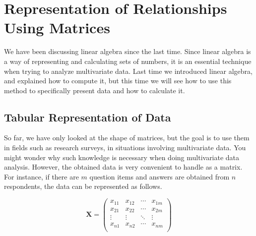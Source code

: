 \documentclass{ltjsbook}
\begin{document}
\chapter{Representation of Relationships Using Matrices}
\label{x07_matrixModel}
We have been discussing linear algebra since the last time. Since linear algebra is a way of representing and calculating sets of numbers, it is an essential technique when trying to analyze multivariate data.
Last time we introduced linear algebra, and explained how to compute it, but this time we will see how to use this method to specifically present data and how to calculate it.

\section{Tabular Representation of Data}

So far, we have only looked at the shape of matrices, but the goal is to use them in fields such as research surveys, in situations involving multivariate data. You might wonder why such knowledge is necessary when doing multivariate data analysis. However, the obtained data is very convenient to handle as a matrix. For instance, if there are $m$ question items and answers are obtained from $n$ respondents, the data can be represented as follows.

\[
	\bm{X}=
	\begin{pmatrix}
		x_{11} & x_{12} & \cdots & x_{1m} \\
		x_{21} & x_{22} & \cdots & x_{2m} \\
		\vdots & \vdots & \ddots & \vdots \\
		x_{n1} & x_{n2} & \cdots & x_{nm} \\
	\end{pmatrix}
\]
\end{document}
